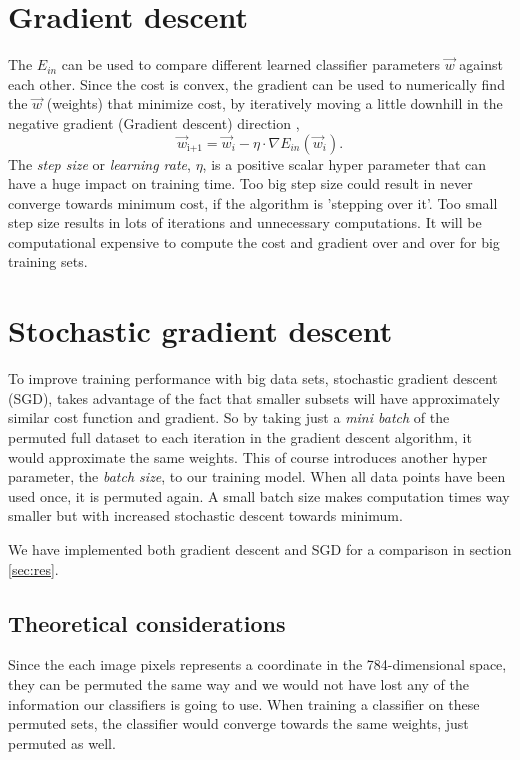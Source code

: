 \documentclass[a4paper,10pt,article,oneside,english]{memoir}
\begin{document}
\section{Gradient descent}
The $E_{in}$ can be used to compare different learned classifier parameters $\vec{w}$ against each other. Since the cost is convex, the gradient can be used to numerically find the $\vec{w}$ (weights) that minimize cost, by iteratively moving a little downhill in the negative gradient (Gradient descent) direction ,
\begin{equation}
\vec{w}_\text{i+1} = \vec{w}_i -\eta \cdot \nabla E_{in}(\vec{w}_i).
\end{equation}
The \emph{step size} or \emph{learning rate}, $\eta$, is a positive scalar hyper parameter that can have a huge impact on training time. Too big step size could result in never converge towards minimum cost, if the algorithm is 'stepping over it'. Too small step size results in lots of iterations and unnecessary computations. It will be computational expensive to compute the cost and gradient over and over for big training sets.



\section{Stochastic gradient descent}
To improve training performance with big data sets, stochastic gradient descent (SGD), takes advantage of the fact that smaller subsets will have approximately similar cost function and gradient. So by taking just a \emph{mini batch} of the permuted full dataset to each iteration in the gradient descent algorithm, it would approximate the same weights. This of course introduces another hyper parameter, the \emph{batch size}, to our training model. When all data points have been used once, it is permuted again. A small batch size makes computation times way smaller but with increased stochastic descent towards minimum. 

We have implemented both gradient descent and SGD for a comparison in section \ref{sec:res}.




\subsection{Theoretical considerations} Since the each image pixels represents a coordinate in the 784-dimensional space, they can be permuted the same way and we would not have lost any of the information our classifiers is going to use. When training a classifier on these permuted sets, the classifier would converge towards the same weights, just permuted as well.
\end{document}
